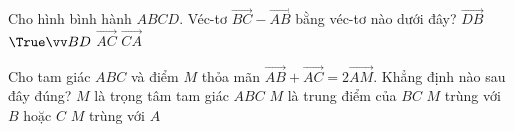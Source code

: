 \begin{ex}%
	Cho hình bình hành $ABCD$. Véc-tơ $\overrightarrow{BC}-\overrightarrow{AB}$ bằng véc-tơ nào dưới đây?
	\choice
	{$\overrightarrow{DB}$}
	{$\True \overrightarrow{BD}$}
	{$\overrightarrow{AC}$}
	{$\overrightarrow{CA}$}
\end{ex}
\begin{ex}%
Cho tam giác $ABC$ và điểm $M$ thỏa mãn $\overrightarrow{AB}+\overrightarrow{AC}=2\overrightarrow{AM}$. Khẳng định nào sau đây đúng?
\choice
{$M$ là trọng tâm tam giác $ABC$}
{\True $M$ là trung điểm của $BC$}
{$M$ trùng với $B$ hoặc $C$}
{$M$ trùng với $A$}
\end{ex}

